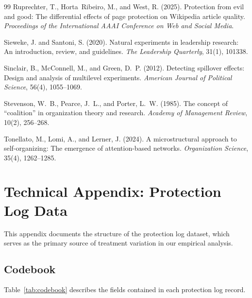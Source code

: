 \documentclass[11pt]{article}
\begin{document}
\begin{thebibliography}{99}
Ruprechter, T., Horta~Ribeiro, M., and West, R. (2025).
\newblock Protection from evil and good: The differential effects of page protection on {W}ikipedia article quality.
\newblock \emph{Proceedings of the International AAAI Conference on Web and Social Media}.

Sieweke, J. and Santoni, S. (2020).
\newblock Natural experiments in leadership research: An introduction, review, and guidelines.
\newblock \emph{The Leadership Quarterly}, 31(1), 101338.

Sinclair, B., McConnell, M., and Green, D.~P. (2012).
\newblock Detecting spillover effects: Design and analysis of multilevel experiments.
\newblock \emph{American Journal of Political Science}, 56(4), 1055--1069.

Stevenson, W.~B., Pearce, J.~L., and Porter, L.~W. (1985).
\newblock The concept of ``coalition'' in organization theory and research.
\newblock \emph{Academy of Management Review}, 10(2), 256--268.

Tonellato, M., Lomi, A., and Lerner, J. (2024).
\newblock A microstructural approach to self-organizing: The emergence of attention-based networks.
\newblock \emph{Organization Science}, 35(4), 1262--1285.

\end{thebibliography}

\clearpage
\appendix

\section{Technical Appendix: Protection Log Data}\label{app:data}

This appendix documents the structure of the protection log dataset, which serves as the primary source of treatment variation in our empirical analysis.

\subsection{Codebook}

Table~\ref{tab:codebook} describes the fields contained in each protection log record.
\end{document}
